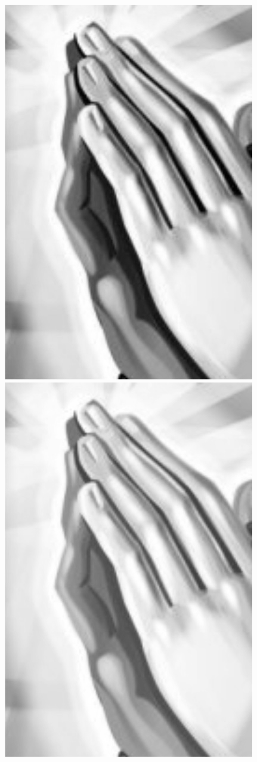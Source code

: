 
\begin{figure}
\centering
\includegraphics[scale=0.15]{gambar/bersyukur1.png}

\includegraphics[scale=0.15]{gambar/bersyukur2.png}


\end{figure}
